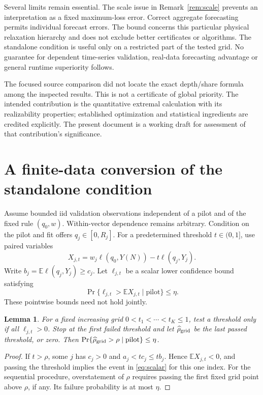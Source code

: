 \documentclass[11pt,a4paper]{article}
\newtheorem{lemma}[theorem]{Lemma}
\theoremstyle{remark}
\newcommand{\E}{\mathbb E}
\begin{document}
Several limits remain essential. The scale issue in
Remark~\ref{rem:scale} prevents an interpretation as a
fixed maximum-loss error. Correct aggregate forecasting permits
individual forecast errors. The bound concerns this particular
physical relaxation hierarchy and does not exclude better
certificates or algorithms. The standalone condition is useful
only on a restricted part of the tested grid. No guarantee for
dependent time-series validation, real-data forecasting advantage
or general runtime superiority follows.

The focused source comparison did not locate the exact
depth/share formula among the inspected results. This is not
a certificate of global priority. The intended contribution
is the quantitative extremal calculation with its realizability
properties; established optimization and statistical ingredients
are credited explicitly. The present document is a working
draft for assessment of that contribution's significance.

\appendix
\section{A finite-data conversion of the standalone condition}
\label{app:validation}

Assume bounded iid validation observations independent of a pilot
and of the fixed rule $(q_0,w)$. Within-vector dependence remains
arbitrary. Condition on the pilot and fit offers $q_j\in[0,R_j]$.
For a predetermined threshold $t\in(0,1]$, use paired variables
\[
 X_{j,t}=w_j\ell(q_0,Y(N))-t\ell(q_j,Y_j).
\]
Write $b_j=\E\ell(q_j,Y_j)\ge c_j$.
Let $\ell_{j,t}$ be a scalar lower confidence bound satisfying
\begin{equation}\label{eq:scalar}
 \Pr\{\ell_{j,t}>\E X_{j,t}\mid\text{pilot}\}\le\eta.
\end{equation}
These pointwise bounds need not hold jointly.

\begin{lemma}\label{lem:iut}
For a fixed increasing grid $0<t_1<\cdots<t_K\le1$, test a
threshold only if all $\ell_{j,t}>0$. Stop at the first failed
threshold and let $\widehat\rho_{\rm grid}$ be the last passed
threshold, or zero. Then
$\Pr\{\widehat\rho_{\rm grid}>\rho\mid\text{pilot}\}\le\eta$.
\end{lemma}
\begin{proof}
If $t>\rho$, some $j$ has $c_j>0$ and
$a_j<t c_j\le t b_j$. Hence $\E X_{j,t}<0$, and passing
the threshold implies the event in \eqref{eq:scalar} for this
one index. For the sequential procedure, overstatement of
$\rho$ requires passing the first fixed grid point above
$\rho$, if any. Its failure probability is at most $\eta$.
\end{proof}
\end{document}
